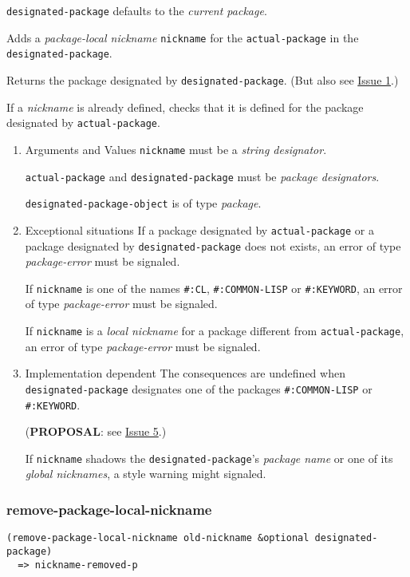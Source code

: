 \documentclass[11pt]{article}
\begin{document}
\texttt{designated-package} defaults to the \emph{current package}.

Adds a \emph{package-local nickname} \texttt{nickname} for the \texttt{actual-package} in the
\texttt{designated-package}.

Returns the package designated by \texttt{designated-package}. (But also see \hyperref[sec:orgb9483d0]{Issue 1}.)

If a \emph{nickname} is already defined, checks that it is defined for the package
designated by \texttt{actual-package}.
\begin{enumerate}
\item Arguments and Values
\label{sec:orgabe80bf}
\texttt{nickname} must be a \emph{string designator}.

\texttt{actual-package} and \texttt{designated-package} must be \emph{package designators}.

\texttt{designated-package-object} is of type \emph{package}.
\item Exceptional situations
\label{sec:org638abe8}
If a package designated by \texttt{actual-package} or a package designated by
\texttt{designated-package} does not exists, an error of type \emph{package-error}
must be signaled.

If \texttt{nickname} is one of the names \texttt{\#:CL}, \texttt{\#:COMMON-LISP} or \texttt{\#:KEYWORD},
an error of type \emph{package-error} must be signaled.

If \texttt{nickname} is a \emph{local nickname} for a package different from
\texttt{actual-package}, an error of type \emph{package-error} must be signaled.
\item Implementation dependent
\label{sec:org268b441}
The consequences are undefined when \texttt{designated-package} designates one of the
packages \texttt{\#:COMMON-LISP} or \texttt{\#:KEYWORD}.

(\textbf{PROPOSAL}: see \hyperref[sec:orge690307]{Issue 5}.)

If \texttt{nickname} shadows the \texttt{designated-package}'s \emph{package name} or one of its
\emph{global nicknames}, a style warning might signaled.
\end{enumerate}
\subsubsection{remove-package-local-nickname}
\label{sec:org14b6085}
\begin{verbatim}
(remove-package-local-nickname old-nickname &optional designated-package)
  => nickname-removed-p
\end{verbatim}
\end{document}
